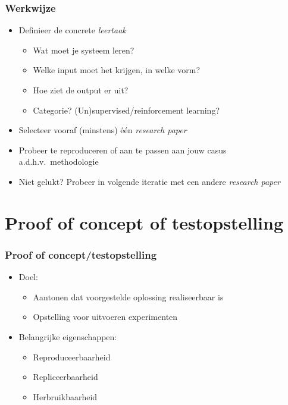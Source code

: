 \documentclass[aspectratio=169]{beamer}
\begin{document}
\begin{frame}[plain]
  \frametitle{Werkwijze}

  \begin{itemize}
    \item Definieer de concrete \textit{leertaak}
    \begin{itemize}
      \item Wat moet je systeem leren?
      \item Welke input moet het krijgen, in welke vorm?
      \item Hoe ziet de output er uit?
      \item Categorie? (Un)supervised/reinforcement learning?
    \end{itemize}
    \item Selecteer vooraf (minstens) één \textit{research paper}
    \item Probeer te reproduceren of aan te passen aan jouw casus a.d.h.v.\ methodologie
    \item Niet gelukt? Probeer in volgende iteratie met een andere \textit{research paper}
  \end{itemize}


\end{frame}

\section{Proof of concept of testopstelling}

\begin{frame}
  \frametitle{Proof of concept/testopstelling}

  \begin{itemize}
    \item Doel:
          \begin{itemize}
            \item Aantonen dat voorgestelde oplossing realiseerbaar is
            \item Opstelling voor uitvoeren experimenten
          \end{itemize}
    \item Belangrijke eigenschappen:
          \begin{itemize}
            \item Reproduceerbaarheid
            \item Repliceerbaarheid
            \item Herbruikbaarheid
          \end{itemize}
  \end{itemize}

\end{frame}
\end{document}
